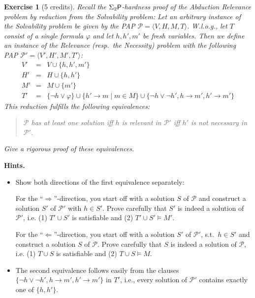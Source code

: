 \documentclass [11pt]{article}
\newtheorem{exercise}{Exercise}
\newcommand{\ra}{\rightarrow}
\newcommand{\Ra}{\Rightarrow}
\newcommand{\La}{\Leftarrow}
\renewcommand{\phi}{\varphi}
\newcommand{\ccfont}[1]{\protect\mathsf{#1}}
\newcommand{\Ptime}{\ccfont{P}}
\newcommand{\phs}[1]{\Sigma_{#1}\Ptime}
\begin{document}
\noindent
\begin{exercise}[5 credits]
{\em Recall the $\phs{2}$-hardness proof of 
the Abduction Relevance problem by reduction from 
the Solvability problem:
Let an arbitrary instance of the Solvability problem be given 
by the PAP  $\mathcal{P}=\langle V,H,M,T \rangle$. 
W.l.o.g., let $T$ consist of a single formula $\phi$ and
let $h, h',m'$ be fresh variables. Then we define an 
instance of the Relevance (resp.\ the Necessity) problem with the 
following PAP
 $\mathcal{P}'=\langle V', H',M',T' \rangle$:
%
\begin{eqnarray*}
V' &=& V\cup\{h,h',m'\} \\
H' &=& H\cup\{h,h'\} \\
M' &=& M\cup\{m'\}\\
T' &=& \{\neg h \vee \phi\} \cup \{h'\ra m \mid m\in M\} \cup \{\neg h \vee \neg h', h \ra m', h' \ra m'\}
\end{eqnarray*}
%
This reduction fulfills the following equivalences: 

\begin{quote}
$\mathcal{P}$ has at least one
solution iff $h$ is relevant in $\mathcal{P}'$ iff 
$h'$ is not necessary in $\mathcal{P}'$.%
\end{quote}

\smallskip
\noindent
Give a rigorous proof of these equivalences.
} %
\end{exercise}


\noindent
{\bf Hints.} 
\begin{itemize}
\item Show both directions of the first equivalence separately:

For the ``$\Ra$''-direction, you start off with a
solution $S$ of $\mathcal{P}$ and construct a solution $S'$ of $\mathcal{P}'$ with $h \in S'$. Prove carefully that $S'$ is indeed a solution of $\mathcal{P}'$, i.e. (1) $T' \cup S'$ is satisfiable
and (2) $T' \cup S' \models M'$. 

For the ``$\La$''-direction, you start off with a
solution $S'$ of $\mathcal{P}'$, s.t.\ $h \in S'$ and construct a solution $S$ of $\mathcal{P}$.
Prove carefully that $S$ is indeed a solution of $\mathcal{P}$, i.e. (1) $T \cup S$ is satisfiable
and (2) $T \cup S \models M$. 

\item The second equivalence 
follows easily from the clauses $\{\neg h \vee \neg h', h \ra m', h' \ra m'\}$ in $T'$, i.e., every solution of 
$\mathcal{P}'$ contains exactly one of $\{h,h'\}$.
\end{itemize}
\end{document}
